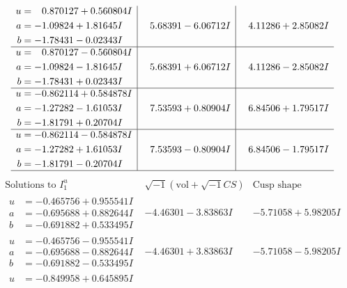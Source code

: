 \documentclass[1p]{elsarticle_modified}
\theoremstyle{definition}
\newcommand{\I}{\sqrt{-1}}
\begin{document}
$$\begin{array}{c|c|c}
\begin{aligned}
u &= \phantom{-}0.870127 + 0.560804 I \\
a &= -1.09824 + 1.81645 I \\
b &= -1.78431 - 0.02343 I\end{aligned}
 & \phantom{-}5.68391 - 6.06712 I & \phantom{-}4.11286 + 2.85082 I \\ \hline\begin{aligned}
u &= \phantom{-}0.870127 - 0.560804 I \\
a &= -1.09824 - 1.81645 I \\
b &= -1.78431 + 0.02343 I\end{aligned}
 & \phantom{-}5.68391 + 6.06712 I & \phantom{-}4.11286 - 2.85082 I \\ \hline\begin{aligned}
u &= -0.862114 + 0.584878 I \\
a &= -1.27282 - 1.61053 I \\
b &= -1.81791 + 0.20704 I\end{aligned}
 & \phantom{-}7.53593 + 0.80904 I & \phantom{-}6.84506 + 1.79517 I \\ \hline\begin{aligned}
u &= -0.862114 - 0.584878 I \\
a &= -1.27282 + 1.61053 I \\
b &= -1.81791 - 0.20704 I\end{aligned}
 & \phantom{-}7.53593 - 0.80904 I & \phantom{-}6.84506 - 1.79517 I\\
 \hline 
 \end{array}$$\newpage$$\begin{array}{c|c|c}  
\text{Solutions to }I^u_{1}& \I (\text{vol} + \sqrt{-1}CS) & \text{Cusp shape}\\
 \hline 
\begin{aligned}
u &= -0.465756 + 0.955541 I \\
a &= -0.695688 + 0.882644 I \\
b &= -0.691882 + 0.533495 I\end{aligned}
 & -4.46301 - 3.83863 I & -5.71058 + 5.98205 I \\ \hline\begin{aligned}
u &= -0.465756 - 0.955541 I \\
a &= -0.695688 - 0.882644 I \\
b &= -0.691882 - 0.533495 I\end{aligned}
 & -4.46301 + 3.83863 I & -5.71058 - 5.98205 I \\ \hline\begin{aligned}
u &= -0.849958 + 0.645895 I \\

\end{aligned}
\end{array}$$
\end{document}
